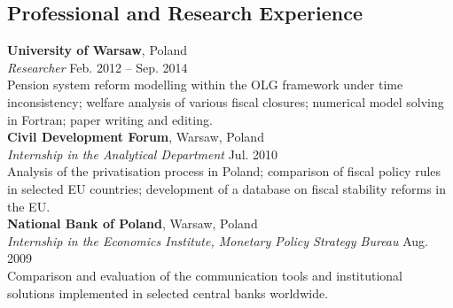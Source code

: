 \documentclass[margin,line]{resume}
\begin{document}
\begin{resume}
    \section{\mysidestyle Professional and Research Experience}
    \textbf{University of Warsaw}, Poland \vspace{0mm}\\
    \textsl{Researcher} \hfill Feb. 2012 -- Sep. 2014\\
Pension system reform modelling within the OLG framework under time inconsistency; welfare analysis of various fiscal closures; numerical model solving in Fortran; paper writing and editing.\vspace{1.5mm} \\
    \textbf{Civil Development Forum}, Warsaw, Poland \\
    \textsl{Internship in the Analytical Department} \hfill Jul. 2010\\
Analysis of the privatisation process in Poland; comparison of fiscal policy rules in selected EU countries; development of a database on fiscal stability reforms in the EU.\vspace{1.5mm} \\
	\textbf{National Bank of Poland}, Warsaw, Poland \\
    \textsl{Internship in the Economics Institute, Monetary Policy Strategy Bureau} \hfill Aug. 2009\\
Comparison and evaluation of the communication tools and institutional solutions implemented in selected central banks worldwide.  


\newpage	        
  

\end{resume}
\end{document}
